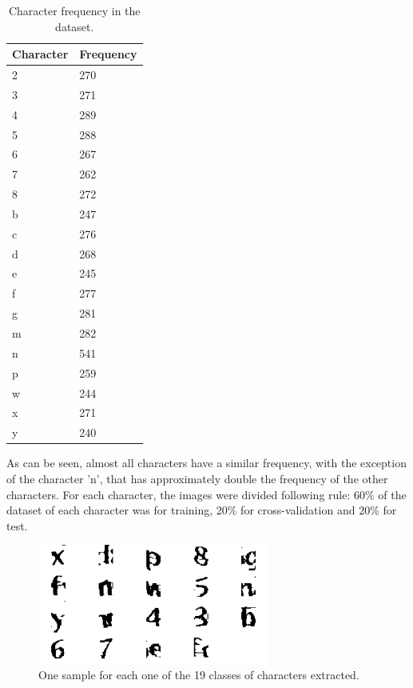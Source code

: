 \documentclass[journal]{IEEEtran}
\begin{document}
\begin{table}[]
\centering
\caption{Character frequency in the dataset.}
\label{table:character_frequency}
\begin{tabular}{|l|l|}
\hline
Character & Frequency \\ \hline
2         & 270       \\ \hline
3         & 271       \\ \hline
4         & 289       \\ \hline
5         & 288       \\ \hline
6         & 267       \\ \hline
7         & 262       \\ \hline
8         & 272       \\ \hline
b         & 247       \\ \hline
c         & 276       \\ \hline
d         & 268       \\ \hline
e         & 245       \\ \hline
f         & 277       \\ \hline
g         & 281       \\ \hline
m         & 282       \\ \hline
n         & 541       \\ \hline
p         & 259       \\ \hline
w         & 244       \\ \hline
x         & 271       \\ \hline
y         & 240       \\ \hline
\end{tabular}
\end{table}

As can be seen, almost all characters have a similar frequency, with the exception of the character 'n', that has approximately double the frequency of the other characters. For each character, the images were divided following rule: 60\% of the dataset of each character was for training, 20\% for cross-validation and 20\% for test.

\begin{figure}[!t]
\centering
\includegraphics[width=3in]{images/character_extraction}
\caption{One sample for each one of the 19 classes of characters extracted.}
\label{characters_extraction}
\end{figure}
\end{document}
